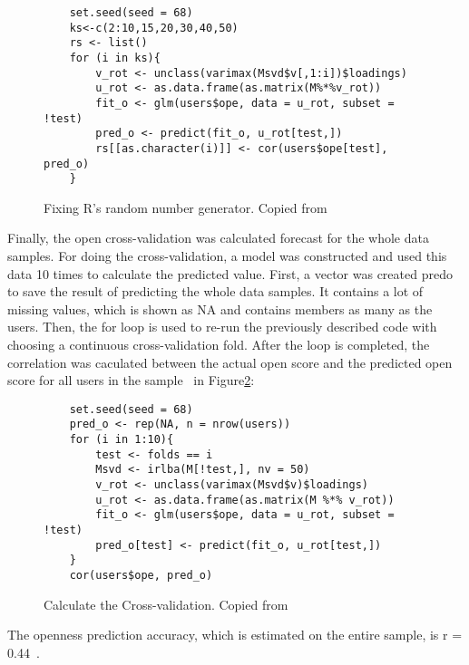 \begin{figure}[htb]
\begin{footnotesize}
\begin{verbatim}
    set.seed(seed = 68)
    ks<-c(2:10,15,20,30,40,50)
    rs <- list()
    for (i in ks){
        v_rot <- unclass(varimax(Msvd$v[,1:i])$loadings)
        u_rot <- as.data.frame(as.matrix(M%*%v_rot))
        fit_o <- glm(users$ope, data = u_rot, subset = !test)
        pred_o <- predict(fit_o, u_rot[test,])
        rs[[as.character(i)]] <- cor(users$ope[test], pred_o)
    }
\end{verbatim}
\end{footnotesize}
\caption{Fixing R's random number generator. 
Copied from~\cite{hid515-12}}
\label{F:Fixing R's random number generator}
\end{figure}


Finally, the open cross-validation was calculated forecast for the 
whole data samples. For doing the cross-validation,  a model was 
constructed and used this data 10 
times to calculate the predicted value. First, a vector was created
predo to save the result of predicting the whole data samples. 
It contains a lot of 
missing values, which is shown as NA and contains members as many
as the users. 
Then, the for loop is used to re-run the previously described
 code with choosing a continuous cross-validation fold. After the 
loop is completed, the correlation was 
caculated between the actual open score and the predicted open 
score for all users in the sample~\cite{hid515-12} 
in Figure\ref{F:cross1}:

\begin{figure}[htb]
\begin{footnotesize}
\begin{verbatim}
    set.seed(seed = 68)
    pred_o <- rep(NA, n = nrow(users))
    for (i in 1:10){
        test <- folds == i
        Msvd <- irlba(M[!test,], nv = 50)
        v_rot <- unclass(varimax(Msvd$v)$loadings)
        u_rot <- as.data.frame(as.matrix(M %*% v_rot))
        fit_o <- glm(users$ope, data = u_rot, subset = !test)
        pred_o[test] <- predict(fit_o, u_rot[test,])
    }
    cor(users$ope, pred_o)
\end{verbatim}
\end{footnotesize}
\caption{Calculate the Cross-validation. Copied from~\cite{hid515-12}}
\label{F:cross1}
\end{figure}


The openness prediction accuracy, which is estimated on the entire
sample, is r = 0.44~\cite{hid515-12}.

